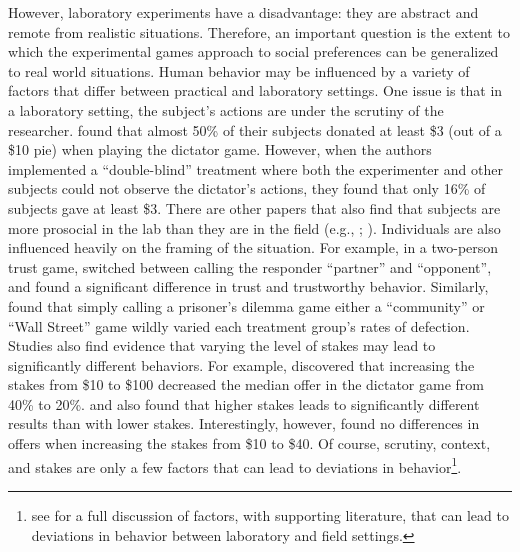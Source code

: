 \documentclass[12pt]{article}
\begin{document}
However, laboratory experiments have a disadvantage: they are abstract and remote from realistic situations. Therefore, an important question is the extent to which the experimental games approach to social preferences can be generalized to real world situations. Human behavior may be influenced by a variety of factors that differ between practical and laboratory settings. One issue is that in a laboratory setting, the subject's actions are under the scrutiny of the researcher. \cite{hoffman_1994} found that almost 50\% of their subjects donated at least \$3 (out of a \$10 pie) when playing the dictator game. However, when the authors implemented a ``double-blind'' treatment where both the experimenter and other subjects could not observe the dictator\rq s actions, they found that only 16\% of subjects gave at least \$3. There are other papers that also find that subjects are more prosocial in the lab than they are in the field (e.g., \cite{list_2006}; \cite{gneezy_2004}). Individuals are also influenced heavily on the framing of the situation. For example, in a two-person trust game, \cite{burnham_mccabe_smith_2000} switched between calling the responder ``partner'' and ``opponent'', and found a significant difference in trust and trustworthy behavior. Similarly, \cite{ross_ward_1996} found that simply calling a prisoner's dilemma game either a ``community'' or ``Wall Street'' game wildly varied each treatment group\rq s rates of defection. Studies also find evidence that varying the level of stakes may lead to significantly different behaviors. For example, \cite{carpenter_verhoogen_burks_2005} discovered that increasing the stakes from \$10 to \$100 decreased the median offer in the dictator game from 40\% to 20\%. \cite{slonim_roth_1998} and \cite{parco_rapoport_stein_2002} also found that higher stakes leads to significantly different results than with lower stakes. Interestingly, however, \cite{cherry_frykblom_shogren_2002} found no differences in offers when increasing the stakes from \$10 to \$40. Of course, scrutiny, context, and stakes are only a few factors that can lead to deviations in behavior\footnote{see \cite{levitt_list_2007} for a full discussion of factors, with supporting literature, that can lead to deviations in behavior between laboratory and field settings.}.
 
\end{document}
